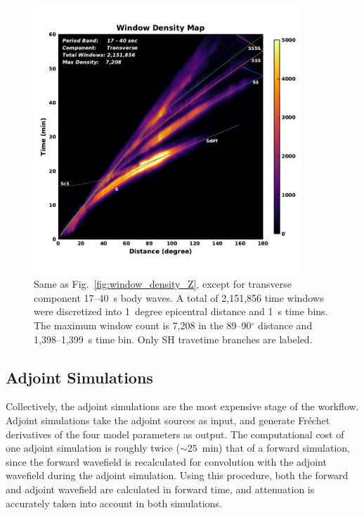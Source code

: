 \begin{figure}
  \centering
  \includegraphics[width=0.9\textwidth]{ch-GLADM25/figures/window_colorbar_linear_T.pdf}
  \caption{\small{Same as Fig.~\ref{fig:window_density_Z}, except for transverse component 17--40~s body waves.
   A total of 2,151,856 time windows were discretized into 1~degree epicentral distance and 1~s time bins.
   The maximum window count is 7,208 in the 89--90$^\circ$ distance and 1,398--1,399~s time bin.
   Only SH travetime branches are labeled.}}
  \label{fig:window_density_T}
\end{figure}

\subsection{Adjoint Simulations}

Collectively,
the adjoint simulations are the most expensive stage of the workflow. 
Adjoint simulations take the adjoint sources as input, and generate Fr\'echet
derivatives of the four model parameters as output.
The computational cost of one adjoint simulation is roughly twice ($\sim25$~min) that of
a forward simulation, since the forward wavefield is recalculated for convolution with
the adjoint wavefield during the adjoint simulation.
Using this procedure,
both the forward and adjoint wavefield are calculated in forward time,
and attenuation is accurately taken into account in both simulations.

